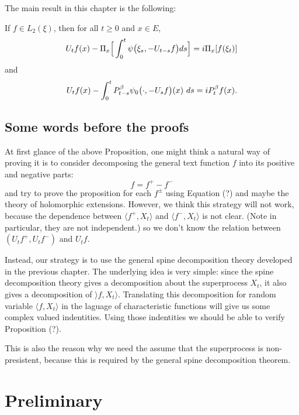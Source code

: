     The main result in this chapter is the following:
\begin{prop}
\label{prop: complex FKPP-equation}
    If $f\in L_2(\xi)$,  then for all $t\geq 0$ and $x\in E$,
\begin{equation}
\label{eq: complex FKPP-equation}
    U_tf(x) - \Pi_x \Big[\int_0^t \psi\big(\xi_s, - U_{t-s}f\big) ds \Big]
    \\= i \Pi_x [f(\xi_t)]
\end{equation}
    and
\begin{equation}
\label{eq: complex FKPP-equation with FK-transform}
    U_tf(x) -  \int_0^t P_{t-s}^{\beta} \psi_0\big(\cdot,-U_sf\big) (x)~ds
    \\= iP_t^{\beta} f(x).
\end{equation}
\end{prop}

\subsection{Some words before the proofs}
	At first glance of the above Proposition, one might think a natural way of proving it is to consider decomposing the general text function $f$ into its positive and negative parts:
\[
	f= f^+ -f^-
\]
	and try to prove the proposition for each $f^\pm$ using Equation (?) and maybe the theory of holomorphic extensions.
	However, we think this strategy will not work, because the dependence between $\langle f^+,X_t\rangle$ and $\langle f^-,X_t\rangle $ is not clear. (Note in particular, they are not independent.) so we don't know the relation between $(U_tf^+,U_tf^-)$ and $U_tf$.

	Instead, our strategy is to use the general spine decomposition theory developed in the previous chapter. 
	The underlying idea is very simple: since the spine decomposition theory gives a decomposition about the superprocess $X_t$, it also gives a decomposition of $\rangle f,X_t\rangle$. 
	Translating this decomposition for random variable $\langle f,X_t\rangle$ in the laguage of characteristic functions will give us some complex valued indentities. 
	Using those indentities we should be able to verify Proposition (?).

	This is also the reason why we need the assume that the superprocess is non-presistent, because this is required by the general spine decomposition theorem. 

\section{Preliminary}
